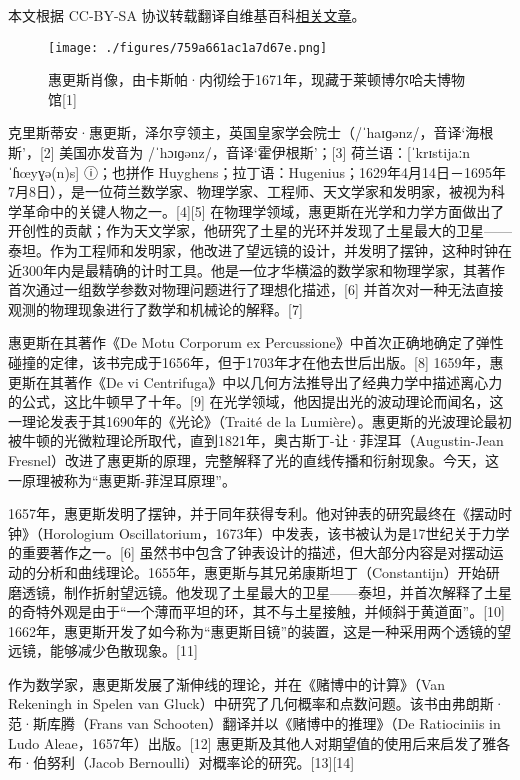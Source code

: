 
本文根据 CC-BY-SA 协议转载翻译自维基百科\href{https://en.wikipedia.org/wiki/Christiaan_Huygens}{相关文章}。

\begin{figure}[ht]
\centering
\texttt{[image: ./figures/759a661ac1a7d67e.png]}
\caption{惠更斯肖像，由卡斯帕·内彻绘于1671年，现藏于莱顿博尔哈夫博物馆[1]} \label{fig_HGS_1}
\end{figure}

克里斯蒂安·惠更斯，泽尔亨领主，英国皇家学会院士（/ˈhaɪɡənz/，音译‘海根斯’，[2] 美国亦发音为 /ˈhɔɪɡənz/，音译‘霍伊根斯’；[3] 荷兰语：[ˈkrɪstijaːn ˈɦœyɣə(n)s] ⓘ；也拼作 Huyghens；拉丁语：Hugenius；1629年4月14日－1695年7月8日），是一位荷兰数学家、物理学家、工程师、天文学家和发明家，被视为科学革命中的关键人物之一。[4][5] 在物理学领域，惠更斯在光学和力学方面做出了开创性的贡献；作为天文学家，他研究了土星的光环并发现了土星最大的卫星——泰坦。作为工程师和发明家，他改进了望远镜的设计，并发明了摆钟，这种时钟在近300年内是最精确的计时工具。他是一位才华横溢的数学家和物理学家，其著作首次通过一组数学参数对物理问题进行了理想化描述，[6] 并首次对一种无法直接观测的物理现象进行了数学和机械论的解释。[7]

惠更斯在其著作《De Motu Corporum ex Percussione》中首次正确地确定了弹性碰撞的定律，该书完成于1656年，但于1703年才在他去世后出版。[8] 1659年，惠更斯在其著作《De vi Centrifuga》中以几何方法推导出了经典力学中描述离心力的公式，这比牛顿早了十年。[9] 在光学领域，他因提出光的波动理论而闻名，这一理论发表于其1690年的《光论》（Traité de la Lumière）。惠更斯的光波理论最初被牛顿的光微粒理论所取代，直到1821年，奥古斯丁-让·菲涅耳（Augustin-Jean Fresnel）改进了惠更斯的原理，完整解释了光的直线传播和衍射现象。今天，这一原理被称为“惠更斯-菲涅耳原理”。

1657年，惠更斯发明了摆钟，并于同年获得专利。他对钟表的研究最终在《摆动时钟》（Horologium Oscillatorium，1673年）中发表，该书被认为是17世纪关于力学的重要著作之一。[6] 虽然书中包含了钟表设计的描述，但大部分内容是对摆动运动的分析和曲线理论。1655年，惠更斯与其兄弟康斯坦丁（Constantijn）开始研磨透镜，制作折射望远镜。他发现了土星最大的卫星——泰坦，并首次解释了土星的奇特外观是由于“一个薄而平坦的环，其不与土星接触，并倾斜于黄道面”。[10] 1662年，惠更斯开发了如今称为“惠更斯目镜”的装置，这是一种采用两个透镜的望远镜，能够减少色散现象。[11]

作为数学家，惠更斯发展了渐伸线的理论，并在《赌博中的计算》（Van Rekeningh in Spelen van Gluck）中研究了几何概率和点数问题。该书由弗朗斯·范·斯库腾（Frans van Schooten）翻译并以《赌博中的推理》（De Ratiociniis in Ludo Aleae，1657年）出版。[12] 惠更斯及其他人对期望值的使用后来启发了雅各布·伯努利（Jacob Bernoulli）对概率论的研究。[13][14]
